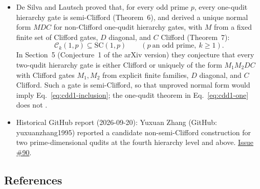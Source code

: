 \begin{itemize}
  \item De Silva and Lautsch proved that, for every odd prime $p$, every one-qudit
  hierarchy gate is semi-Clifford (Theorem~6), and derived a unique normal form
  $MDC$ for non-Clifford one-qudit hierarchy gates, with $M$ from a fixed finite
  set of Clifford gates, $D$ diagonal, and $C$ Clifford (Theorem~7):
  \begin{equation}
    \mathcal{C}_k(1,p)\subseteq\mathrm{SC}(1,p)
    \qquad(p\ \text{an odd prime},\ k\geq1).
    \label{eq:cdd1-one}
  \end{equation}
  In Section~5 (Conjecture~1 of the arXiv version) they conjecture that every
  two-qudit hierarchy gate is either Clifford or uniquely of the form
  $M_1M_2DC$ with Clifford gates $M_1,M_2$ from explicit finite families, $D$
  diagonal, and $C$ Clifford.  Such a gate is semi-Clifford, so that unproved
  normal form would imply Eq.~\eqref{eq:cdd1-inclusion}; the one-qudit theorem in
  Eq.~\eqref{eq:cdd1-one} does not .

  \item Historical GitHub report (2026-09-20): Yuxuan Zhang (GitHub: yuxuanzhang1995) reported a candidate non-semi-Clifford construction for two prime-dimensional qudits at the fourth hierarchy level and above. \href{https://github.com/Naixu-Guo/quantum-open-problems/issues/90}{Issue \#90}.
\end{itemize}

\subsection*{References}

